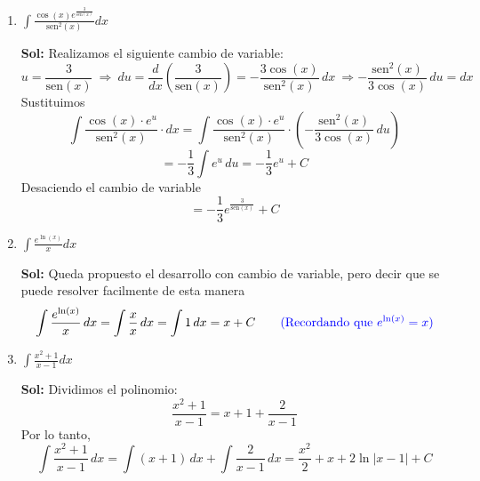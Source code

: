 \documentclass[letterpaper,12pt]{article}
\theoremstyle{plain}
\theoremstyle{definition}
\newcommand{\sen}{\text{sen}}
\begin{document}
\begin{enumerate}
\begin{enumerate}
    \color{blue}
    \textbf{Sol:} Sea \( u = \ln(x) \), entonces derivando, \( du = \frac{1}{x} dx \), reemplazando
\[
\int u \, du = \frac{u^2}{2} + C = \frac{(\ln(x))^2}{2} + C
\]
Por lo tanto:
\[
\int \frac{\ln(x)}{x} \, dx = \frac{(\ln(x))^2}{2} + C
\]
    \color{black}
\item $\displaystyle \int \frac{\cos(x) e^{\frac{3}{\sen(x)}}}{\sen^2(x)} dx$

 \color{blue}
    \textbf{Sol:} Realizamos el siguiente cambio de variable:
\[
u = \frac{3}{\sen(x)} \ \Rightarrow \
du = \frac{d}{dx} \left( \frac{3}{\sen(x)} \right) 
= -\frac{3 \cos(x)}{\sen^2(x)} \, dx
\ \Rightarrow  - \frac{\sen^2(x)}{3 \cos(x)} \, du = dx
\]
Sustituimos
\[
\int \frac{\cos(x) \cdot e^u}{\sen^2(x)} \cdot dx 
= \int \frac{\cos(x) \cdot e^u}{\sen^2(x)} \cdot 
\left( - \frac{\sen^2(x)}{3 \cos(x)} \, du \right)
\]
\[
= - \frac{1}{3} \int e^u \, du
= - \frac{1}{3} e^u + C
\]
Desaciendo el cambio de variable
\[
= - \frac{1}{3} e^{\frac{3}{\sen(x)}} + C
\]
\color{black}
\item $\displaystyle \int \frac{e^{\ln(x)}}{x} dx$

 \color{blue}
    \textbf{Sol:} Queda propuesto el desarrollo con cambio de variable, pero decir que se puede resolver facilmente de esta manera\[
\int \frac{e^{\ln(x)}}{x} \, dx = \int \frac{x}{x} \, dx = \int 1 \, dx = x + C \quad\quad \textcolor{blue}{\text{(Recordando que}\  e^{\ln(x)}=x)}
\]
\color{black}
\item $\displaystyle\int \frac{x^2 + 1}{x - 1} dx$

 \color{blue}
    \textbf{Sol:} Dividimos el polinomio:
\[
\frac{x^2 + 1}{x - 1} = x + 1 + \frac{2}{x - 1}
\]
Por lo tanto,
\[
\int \frac{x^2 + 1}{x - 1} \, dx = \int (x + 1) \, dx + \int \frac{2}{x - 1} \, dx = \frac{x^2}{2} + x + 2 \ln|x - 1| + C
\]
    \color{black}
\end{enumerate}


\end{enumerate}
\end{document}
